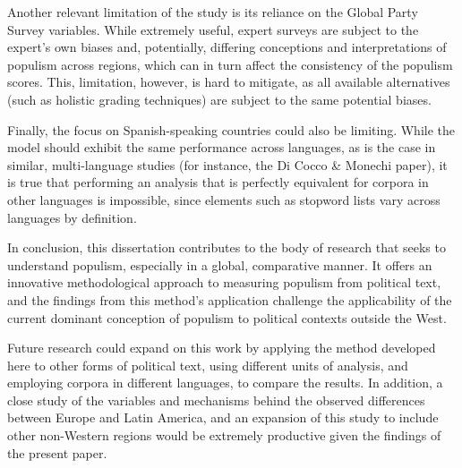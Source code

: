 \documentclass[12pt,letterpaper]{article}
\begin{document}
Another relevant limitation of the study is its reliance on the Global Party Survey variables. While extremely useful, expert surveys are subject to the expert's own biases and, potentially, differing conceptions and interpretations of populism across regions, which can in turn affect the consistency of the populism scores. This, limitation, however, is hard to mitigate, as all available alternatives (such as holistic grading techniques) are subject to the same potential biases. 

Finally, the focus on Spanish-speaking countries could also be limiting. While the model should exhibit the same performance across languages, as is the case in similar, multi-language studies (for instance, the Di Cocco \& Monechi paper\autocite{coccoHowPopulistAre2022}), it is true that performing an analysis that is perfectly equivalent for corpora in other languages is impossible, since elements such as stopword lists vary across languages by definition. 

In conclusion, this dissertation contributes to the body of research that seeks to understand populism, especially in a global, comparative manner. It offers an innovative methodological approach to measuring populism from political text, and the findings from this method's application challenge the applicability of the current dominant conception of populism to political contexts outside the West. 

Future research could expand on this work by applying the method developed here to other forms of political text, using different units of analysis, and employing corpora in different languages, to compare the results. In addition, a close study of the variables and mechanisms behind the observed differences between Europe and Latin America, and an expansion of this study to include other non-Western regions would be extremely productive given the findings of the present paper. 

\newpage
\printbibliography
\end{document}
